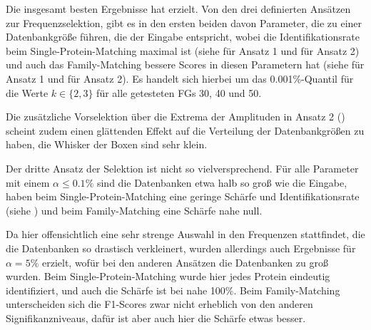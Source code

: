     Die insgesamt besten Ergebnisse hat  erzielt. Von den drei definierten Ansätzen zur Frequenzselektion, gibt es in den ersten beiden davon Parameter, die zu einer Datenbankgröße führen, die der Eingabe entspricht, wobei die Identifikationsrate beim Single-Protein-Matching maximal ist (siehe  für Ansatz 1 und  für Ansatz 2) und auch das Family-Matching bessere Scores in diesen Parametern hat (siehe  für Ansatz 1 und  für Ansatz 2). Es handelt sich hierbei um das 0.001\%-Quantil für die Werte $k \in \{2, 3\}$ für alle getesteten \acp{FG} 30, 40 und 50.

    Die zusätzliche Vorselektion über die Extrema der Amplituden in Ansatz 2 () scheint zudem einen glättenden Effekt auf die Verteilung der Datenbankgrößen zu haben, die Whisker der Boxen sind sehr klein.

    Der dritte Ansatz der Selektion ist nicht so vielversprechend. Für alle Parameter mit einem $\alpha\le 0.1\%$ sind die Datenbanken etwa halb so groß wie die Eingabe, haben beim Single-Protein-Matching eine geringe Schärfe und Identifikationsrate (siehe ) und beim Family-Matching eine Schärfe nahe null.

    Da hier offensichtlich eine sehr strenge Auswahl in den Frequenzen stattfindet, die die Datenbanken so drastisch verkleinert, wurden allerdings auch Ergebnisse für $\alpha=5\%$ erzielt, wofür bei den anderen Ansätzen die Datenbanken zu groß wurden. Beim Single-Protein-Matching wurde hier jedes Protein eindeutig identifiziert, und auch die Schärfe ist bei nahe 100\%. Beim Family-Matching unterscheiden sich die F1-Scores zwar nicht erheblich von den anderen Signifikanzniveaus, dafür ist aber auch hier die Schärfe etwas besser.

